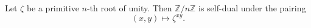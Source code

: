 Let $\zeta$ be a primitive $n$-th root of unity. Then $\mathbb{Z}/n\mathbb{Z}$ is self-dual under the pairing
$$(x, y) \mapsto \zeta^{xy}.$$
